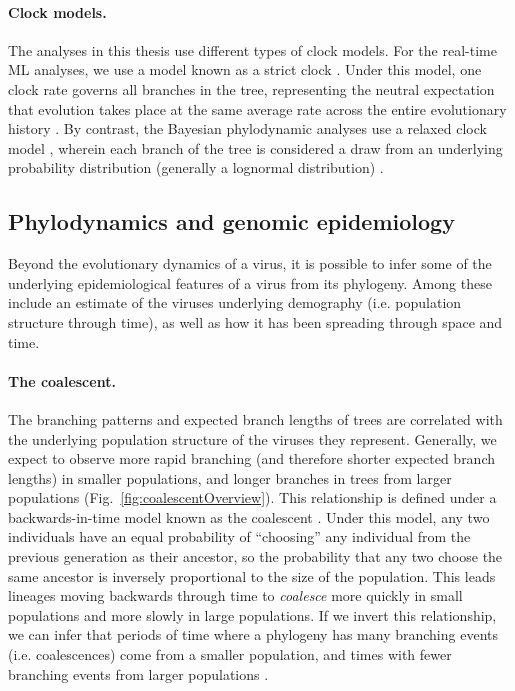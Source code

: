 \paragraph*{Clock models.}
The analyses in this thesis use different types of clock models.
For the real-time ML analyses, we use a model known as a strict clock \citep{brown2011rate}.
Under this model, one clock rate governs all branches in the tree, representing the neutral expectation that evolution takes place at the same average rate across the entire evolutionary history \citep{kimura1968evolutionary}.
By contrast, the Bayesian phylodynamic analyses use a relaxed clock model \citep{brown2011rate}, wherein each branch of the tree is considered a draw from an underlying probability distribution (generally a lognormal distribution) \citep{drummond2006relaxed}.

\subsection{Phylodynamics and genomic epidemiology}\label{ssec:phylodynamics}
Beyond the evolutionary dynamics of a virus, it is possible to infer some of the underlying epidemiological features of a virus from its phylogeny.
Among these include an estimate of the viruses underlying demography (i.e. population structure through time), as well as how it has been spreading through space and time.

\paragraph*{The coalescent.}
The branching patterns and expected branch lengths of trees are correlated with the underlying population structure of the viruses they represent.
Generally, we expect to observe more rapid branching (and therefore shorter expected branch lengths) in smaller populations, and longer branches in trees from larger populations (Fig.~\ref{fig:coalescentOverview}).
This relationship is defined under a backwards-in-time model known as the coalescent \citep{kingman1982coalescent,kingman1982genealogy}.
Under this model, any two individuals have an equal probability of ``choosing'' any individual from the previous generation as their ancestor, so the probability that any two choose the same ancestor is inversely proportional to the size of the population.
This leads lineages moving backwards through time to \textit{coalesce} more quickly in small populations and more slowly in large populations.
If we invert this relationship, we can infer that periods of time where a phylogeny has many branching events (i.e. coalescences) come from a smaller population, and times with fewer branching events from larger populations \citep{pybus2000integrated,drummond2005bayesian,minin2008smooth,gill2013improving}.

